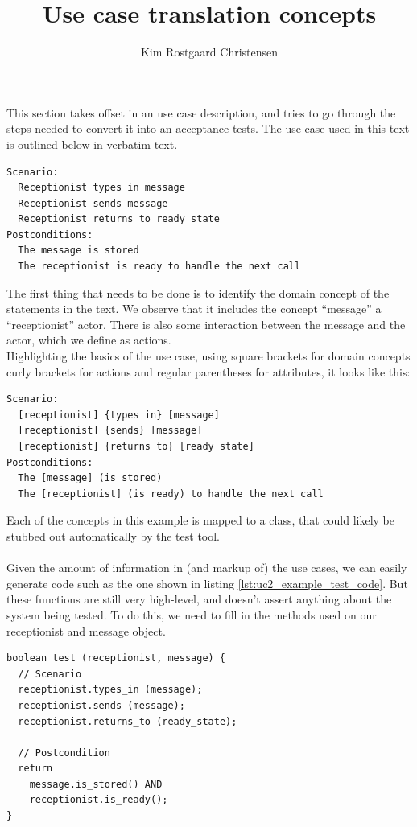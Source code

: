 \documentclass[10pt,a4paper]{article}
\author{Kim Rostgaard Christensen}
\begin{document}
\title{Use case translation concepts}
\maketitle
This section takes offset in an use case description, and tries to go through the steps needed to convert it into an acceptance tests. The use case used in this text is outlined below in verbatim text.
\begin{verbatim}
Scenario:
  Receptionist types in message
  Receptionist sends message
  Receptionist returns to ready state
Postconditions:
  The message is stored
  The receptionist is ready to handle the next call
\end{verbatim} 
The first thing that needs to be done is to identify the domain concept of the statements in the text. We observe that it includes the concept ``message'' a ``receptionist'' actor. There is also some interaction between the message and the actor, which we define as actions.\\
Highlighting the basics of the use case, using square brackets for domain concepts curly brackets for actions and regular parentheses for attributes, it looks like this:
\begin{verbatim}
Scenario:
  [receptionist] {types in} [message]
  [receptionist] {sends} [message]
  [receptionist] {returns to} [ready state]
Postconditions:
  The [message] (is stored)
  The [receptionist] (is ready) to handle the next call
\end{verbatim} 
Each of the concepts in this example is mapped to a class, that could likely be stubbed out automatically by the test tool.\\\\
Given the amount of information in (and markup of) the use cases, we can easily generate code such as the one shown in listing \ref{lst:uc2_example_test_code}. But these functions are still very high-level, and doesn't assert anything about the system being tested. To do this, we need to fill in the methods used on our receptionist and message object.
\begin{lstlisting}[caption=Generated test case,label={lst:uc2_example_test_code}]
boolean test (receptionist, message) {
  // Scenario
  receptionist.types_in (message);
  receptionist.sends (message);
  receptionist.returns_to (ready_state);
  
  // Postcondition
  return
    message.is_stored() AND
    receptionist.is_ready();
}
\end{lstlisting}
\end{document}
